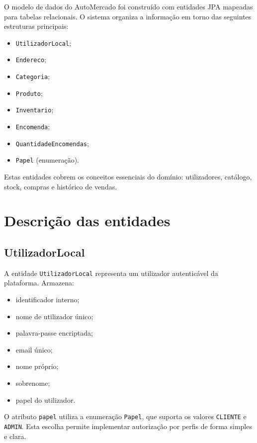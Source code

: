 \documentclass[10pt,a4paper]{report}
\begin{document}
O modelo de dados do AutoMercado foi construído com entidades \ac{JPA} mapeadas para tabelas relacionais. O sistema organiza a informação em torno das seguintes estruturas principais:

\begin{itemize}
    \item \texttt{UtilizadorLocal};
    \item \texttt{Endereco};
    \item \texttt{Categoria};
    \item \texttt{Produto};
    \item \texttt{Inventario};
    \item \texttt{Encomenda};
    \item \texttt{QuantidadeEncomendas};
    \item \texttt{Papel} (enumeração).
\end{itemize}

Estas entidades cobrem os conceitos essenciais do domínio: utilizadores, catálogo, stock, compras e histórico de vendas.

\section{Descrição das entidades}

\subsection{UtilizadorLocal}

A entidade \texttt{UtilizadorLocal} representa um utilizador autenticável da plataforma. Armazena:

\begin{itemize}
    \item identificador interno;
    \item nome de utilizador único;
    \item palavra-passe encriptada;
    \item email único;
    \item nome próprio;
    \item sobrenome;
    \item papel do utilizador.
\end{itemize}

O atributo \texttt{papel} utiliza a enumeração \texttt{Papel}, que suporta os valores \texttt{CLIENTE} e \texttt{ADMIN}. Esta escolha permite implementar autorização por perfis de forma simples e clara.
\end{document}
